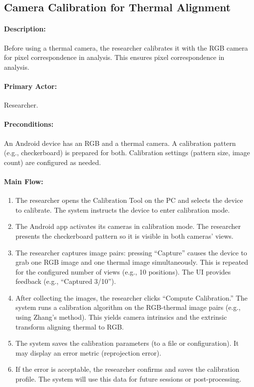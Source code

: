 \subsection{Camera Calibration for Thermal Alignment}

\paragraph{Description:} Before using a thermal camera, the researcher calibrates it with the RGB camera for pixel correspondence in analysis. This ensures pixel correspondence in analysis.

\paragraph{Primary Actor:} Researcher.

\paragraph{Preconditions:} An Android device has an RGB and a thermal camera. A calibration pattern (e.g., checkerboard) is prepared for both. Calibration settings (pattern size, image count) are configured as needed.

\paragraph{Main Flow:}
\begin{enumerate}
    \item The researcher opens the Calibration Tool on the PC and selects the device to calibrate. The system instructs the device to enter calibration mode.
    \item The Android app activates its cameras in calibration mode. The researcher presents the checkerboard pattern so it is visible in both cameras’ views.
    \item The researcher captures image pairs: pressing “Capture” causes the device to grab one RGB image and one thermal image simultaneously. This is repeated for the configured number of views (e.g., 10 positions). The UI provides feedback (e.g., “Captured 3/10”).
    \item After collecting the images, the researcher clicks “Compute Calibration.” The system runs a calibration algorithm on the RGB-thermal image pairs (e.g., using Zhang’s method). This yields camera intrinsics and the extrinsic transform aligning thermal to RGB.
    \item The system saves the calibration parameters (to a file or configuration). It may display an error metric (reprojection error).
    \item If the error is acceptable, the researcher confirms and saves the calibration profile. The system will use this data for future sessions or post-processing.
\end{enumerate}

